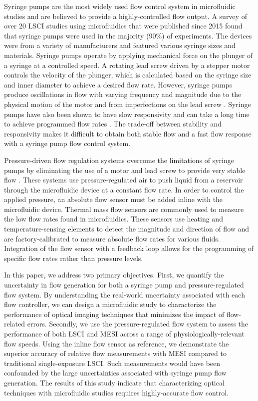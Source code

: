 \documentclass[12pt]{spieman}
\begin{document}
\begin{spacing}{2}
Syringe pumps are the most widely used flow control system in microfluidic studies and are believed to provide a highly-controlled flow output. A survey of over 20 LSCI studies using microfluidics that were published since 2015 found that syringe pumps were used in the majority (90\%) of experiments. The devices were from a variety of manufacturers and featured various syringe sizes and materials. Syringe pumps operate by applying mechanical force on the plunger of a syringe at a controlled speed. A rotating lead screw driven by a stepper motor controls the velocity of the plunger, which is calculated based on the syringe size and inner diameter to achieve a desired flow rate. However, syringe pumps produce oscillations in flow with varying frequency and magnitude due to the physical motion of the motor and from imperfections on the lead screw \cite{Korczyk:2010eu,Li:2014ca}. Syringe pumps have also been shown to have slow responsivity and can take a long time to achieve programmed flow rates \cite{Zhou:2011ey}. The trade-off between stability and responsivity makes it difficult \cite{Kang.2012} to obtain both stable flow and a fast flow response with a syringe pump flow control system.

Pressure-driven flow regulation systems overcome the limitations of syringe pumps by eliminating the use of a motor and lead screw to provide very stable flow \cite{Korczyk:2010eu,Li:2014ca,Zhou:2011ey}. These systems use pressure-regulated air to push liquid from a reservoir through the microfluidic device at a constant flow rate. In order to control the applied pressure, an absolute flow sensor must be added inline with the microfluidic device. Thermal mass flow sensors are commonly used to measure the low flow rates found in microfluidics. These sensors use heating and temperature-sensing elements to detect the magnitude and direction of flow and are factory-calibrated to measure absolute flow rates for various fluids. Integration of the flow sensor with a feedback loop allows for the programming of specific flow rates rather than pressure levels.

In this paper, we address two primary objectives. First, we quantify the uncertainty in flow generation for both a syringe pump and pressure-regulated flow system. By understanding the real-world uncertainty associated with each flow controller, we can design a microfluidic study to characterize the performance of optical imaging techniques that minimizes the impact of flow-related errors. Secondly, we use the pressure-regulated flow system to assess the performance of both LSCI and MESI across a range of physiologically-relevant flow speeds. Using the inline flow sensor as reference, we demonstrate the superior accuracy of relative flow measurements with MESI compared to traditional single-exposure LSCI. Such measurements would have been confounded by the large uncertainties associated with syringe pump flow generation. The results of this study indicate that characterizing optical techniques with microfluidic studies requires highly-accurate flow control.



\end{spacing}
\end{document}
